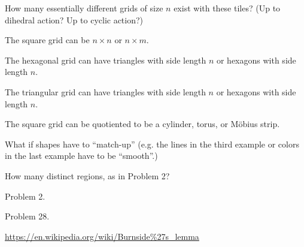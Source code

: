 \documentclass{article}
\begin{document}
\begin{question}
  How many essentially different grids of size $n$ exist with these tiles?
  (Up to dihedral action? Up to cyclic action?)
\end{question}
\begin{related}
  \item The square grid can be $n \times n$ or $n \times m$.
  \item The hexagonal grid can have triangles with side length $n$ or hexagons with side length $n$.
  \item The triangular grid can have triangles with side length $n$ or hexagons with side length $n$.
  \item The square grid can be quotiented to be a cylinder, torus, or M\"obius strip.
  \item What if shapes have to ``match-up'' (e.g. the lines in the third example
    or colors in the last example have to be ``smooth''.)
  \item How many distinct regions, as in Problem 2?
\end{related}
\begin{references}
  \item Problem 2.
  \item Problem 28.
  \item \url{https://en.wikipedia.org/wiki/Burnside%27s_lemma}
\end{references}
\end{document}
